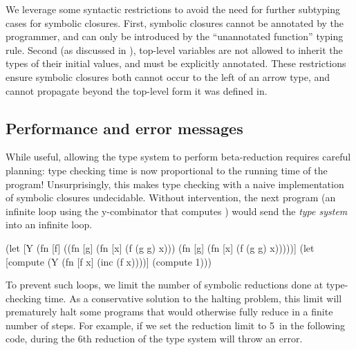 We leverage some syntactic restrictions
to avoid the need for further subtyping cases for symbolic closures.
First, symbolic closures cannot be annotated by the programmer,
and can only be introduced by the ``unannotated function'' typing rule.
Second (as discussed in ),
top-level variables are not allowed to inherit the types of their initial
values, and must be explicitly annotated.
These restrictions ensure symbolic closures both cannot occur to the
left of an arrow type, and 
cannot propagate beyond the top-level form it was defined in.

\subsection{Performance and error messages}


While useful, allowing the type system to perform beta-reduction
requires careful planning: type checking time is now proportional 
to the running time of the program!
Unsurprisingly, this makes type checking with a naive implementation of symbolic
closures undecidable.
Without intervention,
the next program (an infinite loop using the y-combinator that computes )
would send the \emph{type system} into an infinite loop.


\begin{cljlisting}
(let [Y (fn [f]
          ((fn [g] (fn [x] (f (g g) x)))
           (fn [g] (fn [x] (f (g g) x)))))]
  (let [compute (Y (fn [f x] (inc (f x))))]
    (compute 1)))
\end{cljlisting}

To prevent such loops, we limit the number of symbolic reductions
done at type-checking time.
As a conservative solution to the halting
problem, this limit will prematurely halt some programs that would
otherwise fully reduce in a finite number of steps.
For example, if we set the reduction limit to 5\ in
the following code,
during the 6th reduction of  the type system will
throw an error.

